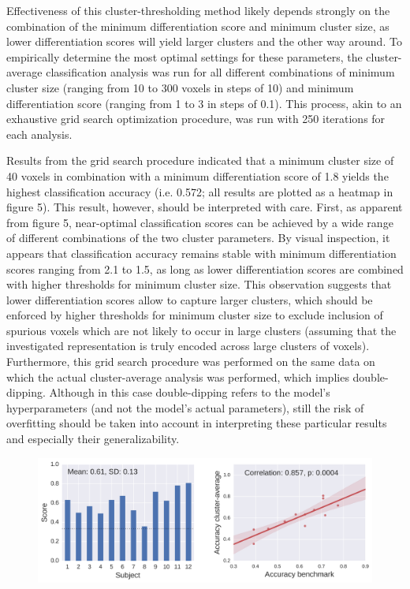 \documentclass[jou,12pt,a4paper]{apa6}
\begin{document}
{Effectiveness of this cluster-thresholding method likely depends strongly on the combination of the minimum differentiation score and minimum cluster size, as lower differentiation scores will yield larger clusters and the other way around. To empirically determine the most optimal settings for these parameters, the cluster-average classification analysis was run for all different combinations of minimum cluster size (ranging from 10 to 300 voxels in steps of 10) and minimum differentiation score (ranging from 1 to 3 in steps of 0.1). This process, akin to an exhaustive grid search optimization procedure, was run with 250 iterations for each analysis. 

Results from the grid search procedure indicated that a minimum cluster size of 40 voxels in combination with a minimum differentiation score of 1.8 yields the highest classification accuracy (i.e. 0.572; all results are plotted as a heatmap in figure 5). This result, however, should be interpreted with care. First, as apparent from figure 5, near-optimal classification scores can be achieved by a wide range of different combinations of the two cluster parameters. By visual inspection, it appears that classification accuracy remains stable with minimum differentiation scores ranging from 2.1 to 1.5, as long as lower differentiation scores are combined with higher thresholds for minimum cluster size. This observation suggests that lower differentiation scores allow to capture larger clusters, which should be enforced by higher thresholds for minimum cluster size to exclude inclusion of spurious voxels which are not likely to occur in large clusters (assuming that the investigated representation is truly encoded across large clusters of voxels). Furthermore, this grid search procedure was performed on the same data on which the actual cluster-average analysis was performed, which implies double-dipping. Although in this case double-dipping refers to the model's hyperparameters (and not the model's actual parameters), still the risk of overfitting should be taken into account in interpreting these particular results and especially their generalizability.  

\begin{figure}[ht]
\centering
\includegraphics[width=\textwidth]{Cluster_average_plot_new}
\end{figure}

}
\end{document}
